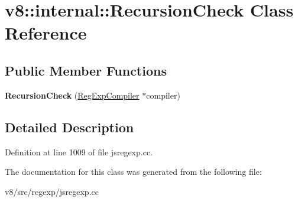 \hypertarget{classv8_1_1internal_1_1RecursionCheck}{}\section{v8\+:\+:internal\+:\+:Recursion\+Check Class Reference}
\label{classv8_1_1internal_1_1RecursionCheck}
\subsection*{Public Member Functions}
\begin{DoxyCompactItemize}
\item 
\mbox{\label{classv8_1_1internal_1_1RecursionCheck_a35c0b952b582e12ff1307c6e804b4d90}} 
{\bfseries Recursion\+Check} (\mbox{\hyperlink{classv8_1_1internal_1_1RegExpCompiler}{Reg\+Exp\+Compiler}} $\ast$compiler)
\end{DoxyCompactItemize}


\subsection{Detailed Description}


Definition at line 1009 of file jsregexp.\+cc.



The documentation for this class was generated from the following file\+:\begin{DoxyCompactItemize}
\item 
v8/src/regexp/jsregexp.\+cc\end{DoxyCompactItemize}
